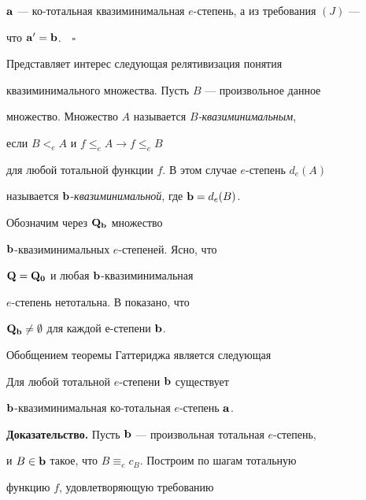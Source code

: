 ${\bold a}$ --- ко-тотальная квазиминимальная $e$-степень, а из требования $(J)$ ---


что ${\bold a}'={\bold b}$.$\quad\square$


\medskip





Представляет интерес следующая релятивизация понятия


квазиминимального множества. Пусть $B$ --- произвольное данное


множество. Множество $A$ называется {\it $B$-квазиминимальным},


если $B<_eA$ и $f\leq_eA\to f\leq_eB$


для любой тотальной функции $f$. В этом случае $e$-степень $d_e(A)$


называется ${\bold b}$-{\it квазиминимальной}, где ${\bold b}=d_e(B)$.


Обозначим через ${\bold Q}_{{\bold b}}$ множество


${\bold b}$-квазиминимальных $e$-степеней. Ясно, что


${\bold Q}={\bold Q}_{{\bold 0}}$ и любая ${\bold b}$-квазиминимальная


$e$-степень нетотальна. В \cite{r8} показано, что


${\bold Q}_{{\bold b}}\neq\emptyset$ для каждой $е$-степени ${\bold b}$.





Обобщением теоремы Гаттериджа \cite{r2} является следующая








\begin{thm}


Для любой тотальной $e$-степени ${\bold b}$ существует


${\bold b}$-квазиминимальная ко-то\-таль\-ная $e$-степень ${\bold a}$.


\end{thm}





{\bf Доказательство.} Пусть ${\bold b}$ --- произвольная тотальная $e$-степень,


и $B\in{\bold b}$ такое, что $B\equiv_ec_B$. Построим по шагам тотальную


функцию $f$, удовлетворяющую требованию





